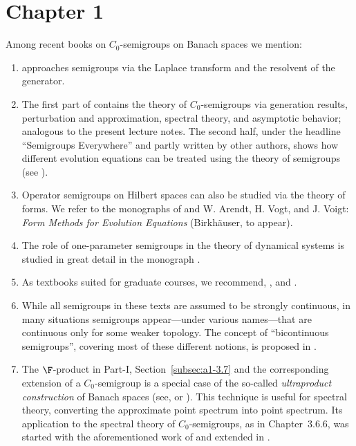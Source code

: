 \setcounter{section}{0}
\notesheaderone
\thispagestyle{empty}
\section*{Chapter 1}
Among recent books on $C_{0}$-semigroups on Banach spaces we mention:
\begin{enumerate}
\item 
\textcite{zbmath05842872} approaches semigroups via the Laplace transform and the resolvent of the generator. 

\item 
The first part of \textcite{zbmath01354832} contains the theory of $C_{0}$-semigroups via generation results, perturbation and approximation, spectral theory, and asymptotic behavior; analogous to the present lecture notes. 
The second half, under the headline \enquote{Semigroups Everywhere} and partly written by other authors, shows how different evolution equations can be treated using the theory of semigroups (see \textcite[Chap. VI]{zbmath01354832}).

\item 
Operator semigroups on Hilbert spaces can also be studied via the theory of forms.
We refer to the monographs of \textcite{zbmath02168554} and W. Arendt, H. Vogt, and J. Voigt: \emph{Form Methods for Evolution Equations} (Birkhäuser, to appear).

\item
The role of one-parameter semigroups in the theory of dynamical systems is studied in great detail in the monograph \textcite{zbmath01329917}.

\item
As textbooks suited for graduate courses, we recommend, \eg 
\textcite{zbmath07066876}, \textcite{zbmath05051510} and
\textcite{zbmath06706234}.

\item
While all semigroups in these texts are assumed to be strongly continuous, in many situations semigroups appear---under various names---that are continuous only for some weaker topology. 
The concept of \enquote{bicontinuous semigroups}, covering most of these different notions, is proposed in \textcite{zbmath02051541}. 
\item
The $\F$-product in Part-I, Section~\ref{subsec:a1-3.7} and the corresponding extension of a $C_{0}$-semigroup is a special case of the so-called \emph{ultraproduct construction} of Banach spaces (see, \eg \textcite{zbmath03640303} or \textcite{zbmath03987965}).
This technique is useful for spectral theory, converting the approximate point spectrum into point spectrum. 
Its application to the spectral theory of $C_{0}$-semigroups, as in 
\mbox{Chapter 3.6.6}, was started with the aforementioned work of \textcite{derndingerEN:1980} and extended in \textcite{zbmath069217}.


\end{enumerate}
